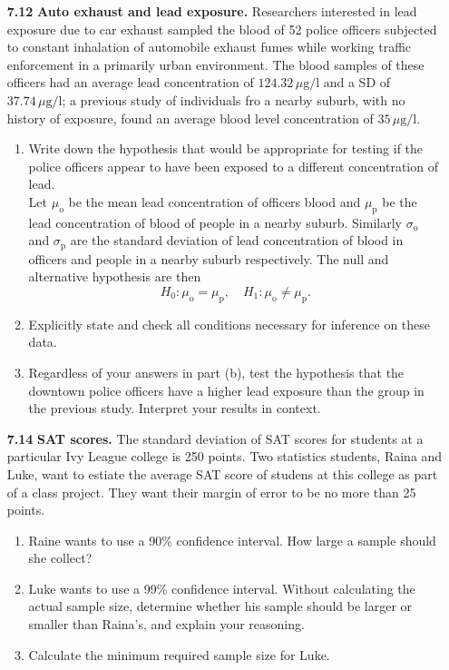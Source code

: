 \documentclass[a4paper, 12pt]{../../config/homework}
\begin{document}
\begin{enumerate}
\pagebreak
\item[\textbf{7.12}] \textbf{Auto exhaust and lead exposure.} Researchers interested in lead exposure due to car exhaust sampled the blood of 52 police officers subjected to constant inhalation of automobile exhaust fumes while working traffic enforcement in a primarily urban environment. The blood samples of these officers had an average lead concentration of \(124.32\,\mu\text{g}/\text{l}\) and a SD of \(37.74\,\mu\text{g}/\text{l}\); a previous study of individuals fro a nearby suburb, with no history of exposure, found an average blood level concentration of \(35\,\mu\text{g}/\text{l}\).
\begin{enumerate}[label=(\alph*)]
\item Write down the hypothesis that would be appropriate for testing if the police officers appear to have been exposed to a different concentration of lead.
\\Let \(\mu_{\text{o}}\) be the mean lead concentration of officers blood and \(\mu_{\text{p}}\) be the lead concentration of blood of people in a nearby suburb. Similarly \(\sigma_{\text{o}}\) and \(\sigma_{\text{p}}\) are the standard deviation of lead concentration of blood in officers and people in a nearby suburb respectively. The null and alternative hypothesis are then
\[H_0 : \mu_{\text{o}} = \mu_{\text{p}}, \quad H_1 : \mu_{\text{o}} \ne \mu_{\text{p}}.\]

\item Explicitly state and check all conditions necessary for inference on these data.
\item Regardless of your answers in part (b), test the hypothesis that the downtown police officers have a higher lead exposure than the group in the previous study. Interpret your results in context.
\end{enumerate}

\pagebreak
\item[\textbf{7.14}] \textbf{SAT scores.} The standard deviation of SAT scores for students at a particular Ivy League college is 250 points. Two statistics students, Raina and Luke, want to estiate the average SAT score of studens at this college as part of a class project. They want their margin of error to be no more than 25 points.
\begin{enumerate}[label=(\alph*)]
\item Raine wants to use a 90\% confidence interval. How large a sample should she collect?
\item Luke wants to use a 99\% confidence interval. Without calculating the actual sample size, determine whether his sample should be larger or smaller than Raina's, and explain your reasoning.
\item Calculate the minimum required sample size for Luke.
\end{enumerate}


\end{enumerate}
\end{document}
